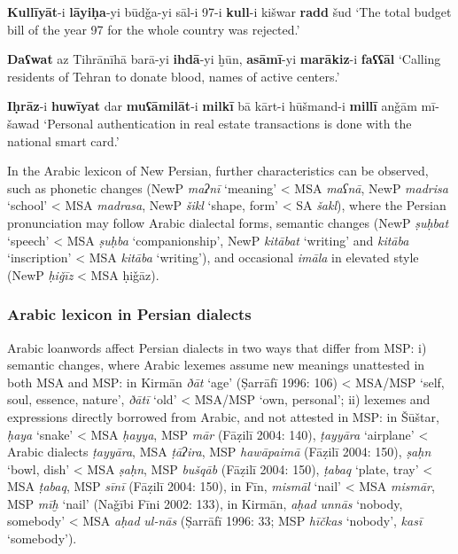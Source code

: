 \documentclass[output=paper]{langsci/langscibook}
\begin{document}
\ea
\ea \textbf{Kullīyāt}-i \textbf{lāyiḥa}-yi būdǧa-yi sāl-i 97-i \textbf{kull}-i kišwar \textbf{radd} šud
    \glt ‘The total budget bill of the year 97 for the whole country was rejected.’

\ex \textbf{Daʕwat} {az} {Tihrānīhā} barā-yi \textbf{ihdā}-yi ḫūn, \textbf{asāmī}-yi \textbf{marākiz}-i \textbf{faʕʕāl} 
    \glt ‘Calling residents of Tehran to donate blood, names of active centers.’

\ex \textbf{Iḥrāz}-i \textbf{huwīyat} dar \textbf{muʕāmilāt}-i \textbf{milkī} {bā} {kārt-i} hūšmand-i \textbf{millī} {anǧām} {mī-šawad} 
    \glt‘Personal authentication in real estate transactions is done with the national smart card.’
\z
\z


In the Arabic lexicon of New Persian, further characteristics can be observed, such as phonetic changes (NewP \textit{maʔnī} ‘meaning’ < MSA \textit{maʕnā}, NewP \textit{madrisa} ‘school’ < MSA \textit{madrasa}, NewP \textit{šikl} ‘shape, form’ < SA \textit{šakl}), where the Persian pronunciation may follow Arabic dialectal forms, semantic changes (NewP \textit{ṣuḥbat} ‘speech’ < MSA \textit{ṣuḥba} ‘companionship’, NewP \textit{kitābat} ‘writing’ and \textit{kitāba} ‘inscription’ < MSA \textit{kitāba} ‘writing’), and occasional \textit{imāla} in elevated style (NewP \textit{ḥiǧīz} < MSA ḥiǧāz).

\subsubsection{Arabic lexicon in Persian dialects}

Arabic loanwords affect Persian dialects in two ways that differ from MSP: i) semantic changes, where Arabic lexemes assume new meanings unattested in both MSA and MSP: in Kirmān \textit{ðāt} ‘age’   (Ṣarrāfī 1996: 106) < MSA/MSP ‘self, soul, essence, nature’, \textit{ðātī} ‘old’ < MSA/MSP ‘own, personal’; ii) lexemes and expressions directly borrowed from Arabic, and not attested in MSP: in Šūštar, \textit{ḥaya} ‘snake’ < MSA \textit{ḥayya}, MSP \textit{mār} (Fāẓilī 2004: 140), \textit{ṭayyāra} ‘airplane’ < Arabic dialects \textit{ṭayyāra}, MSA \textit{ṭāʔira}, MSP \textit{hawāpaimā} (Fāẓilī 2004: 150), \textit{ṣaḥn} ‘bowl, dish’ < MSA \textit{ṣaḥn}, MSP \textit{bušqāb} (Fāẓilī 2004: 150), \textit{ṭabaq} ‘plate, tray’ < MSA \textit{ṭabaq}, MSP \textit{sīnī} (Fāẓilī 2004: 150), in Fīn, \textit{mismāl} ‘nail’ < MSA \textit{mismār}, MSP \textit{mīḫ} ‘nail’ (Naǧībi Fīni 2002: 133), in Kirmān, \textit{aḥad} \textit{unnās} ‘nobody, somebody’ < MSA \textit{aḥad} \textit{ul-nās} (Ṣarrāfī 1996: 33; MSP \textit{hīčkas} ‘nobody’, \textit{kasī} ‘somebody’).
\end{document}
